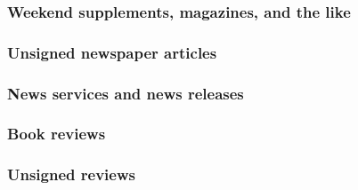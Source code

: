 \documentclass[11pt,letterpaper,oneside]{article}
\begin{document}
\begin{citebib}
\item \cite{jaffe2015}
\item \cite{editorial2015}
\end{citebib}

\setcounter{subsubsection}{196}
\subsubsection{Weekend supplements, magazines, and the like}

\begin{citebib}
\item \cite[48]{ghansah2015}
\end{citebib}

\setcounter{subsubsection}{198}
\subsubsection{Unsigned newspaper articles}

\begin{citebib}
\item \cite{nytimes2002}
\end{citebib}

\subsubsection{News services and news releases}

\begin{citebib}
\item \cite{ap2015}
\end{citebib}

\setcounter{subsubsection}{201}
\subsubsection{Book reviews}
\label{14.202}

\begin{citebib}
\item \cite[B13--B14]{ratliff1999}
\item \cite{kamp2006}
\item \cite{brehm2015}
\end{citebib}

\setcounter{subsubsection}{203}
\subsubsection{Unsigned reviews}
\label{14.204}
\end{document}
